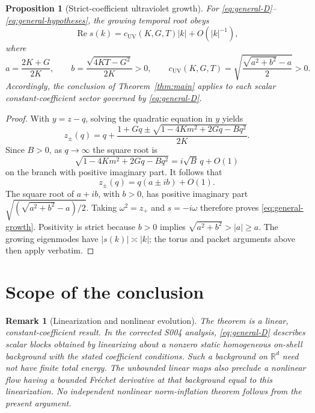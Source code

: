 \documentclass[11pt]{article}
\newtheorem{proposition}[theorem]{Proposition}
\newtheorem{remark}[theorem]{Remark}
\newcommand{\RR}{\mathbb{R}}
\begin{document}
\begin{proposition}[Strict-coefficient ultraviolet growth]\label{prop:general}
For \eqref{eq:general-D}--\eqref{eq:general-hypotheses}, the growing temporal root obeys
\begin{equation}\label{eq:general-growth}
 \operatorname{Re}s(k)=c_{\mathrm{UV}}(K,G,T)|k|+O(|k|^{-1}),
\end{equation}
where
\begin{equation}\label{eq:general-c}
  a=\frac{2K+G}{2K},\qquad
  b=\frac{\sqrt{4KT-G^2}}{2K}>0,\qquad
  c_{\mathrm{UV}}(K,G,T)
     =\sqrt{\frac{\sqrt{a^2+b^2}-a}{2}}>0.
\end{equation}
Accordingly, the conclusion of Theorem~\ref{thm:main} applies to each scalar constant-coefficient sector governed by \eqref{eq:general-D}.
\end{proposition}

\begin{proof}
With \(y=z-q\), solving the quadratic equation in \(y\) yields
\[
  z_\pm(q)=q+\frac{1+Gq\pm
           \sqrt{1-4Km^2+2Gq-Bq^2}}{2K}.
\]
Since \(B>0\), as \(q\to\infty\) the square root is
\[
  \sqrt{1-4Km^2+2Gq-Bq^2}=i\sqrt B\,q+O(1)
\]
on the branch with positive imaginary part. It follows that
\[
  z_\pm(q)=q(a\pm ib)+O(1).
\]
The square root of \(a+ib\), with \(b>0\), has positive imaginary part
\(
\sqrt{(\sqrt{a^2+b^2}-a)/2}
\). Taking \(\omega^2=z_+\) and \(s=-i\omega\) therefore proves \eqref{eq:general-growth}. Positivity is strict because \(b>0\) implies \(\sqrt{a^2+b^2}>|a|\ge a\). The growing eigenmodes have \(|s(k)|\asymp|k|\); the torus and packet arguments above then apply verbatim.
\end{proof}

\section{Scope of the conclusion}

\begin{remark}[Linearization and nonlinear evolution]
The theorem is a linear, constant-coefficient result. In the corrected S004 analysis, \eqref{eq:general-D} describes scalar blocks obtained by linearizing about a nonzero static homogeneous on-shell background with the stated coefficient conditions. Such a background on \(\RR^d\) need not have finite total energy. The unbounded linear maps also preclude a nonlinear flow having a bounded Fr\'echet derivative at that background equal to this linearization. No independent nonlinear norm-inflation theorem follows from the present argument.
\end{remark}
\end{document}
